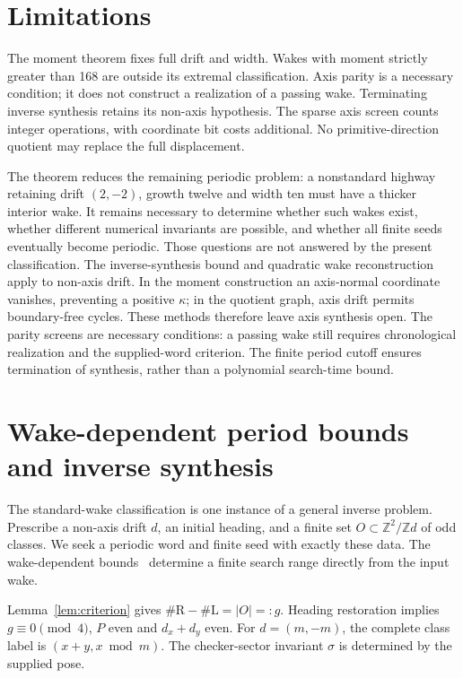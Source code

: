 \documentclass[11pt]{article}
\theoremstyle{definition}\newtheorem{definition}[theorem]{Definition}
\newcommand{\R}{\mathrm R}
\newcommand{\Lturn}{\mathrm L}
\newcommand{\Z}{\mathbb Z}
\begin{document}
\section{Limitations}\label{sec:limitations}
The moment theorem fixes full drift and width. Wakes with moment strictly
greater than 168 are outside its extremal classification.
Axis parity is a necessary condition; it does not construct a realization of a
passing wake. Terminating inverse synthesis retains its non-axis hypothesis.
The sparse axis screen counts integer operations, with coordinate bit costs
additional. No primitive-direction quotient may replace the full displacement.

The theorem reduces the remaining periodic problem: a
nonstandard highway retaining drift $(2,-2)$, growth twelve and width ten must
have a thicker interior wake. It remains necessary to determine whether such
wakes exist, whether different numerical invariants are possible, and whether
all finite seeds eventually become periodic. Those questions are not answered
by the present classification.
The inverse-synthesis bound and quadratic wake reconstruction apply to non-axis
drift. In the moment construction an axis-normal coordinate vanishes, preventing
a positive $\kappa$; in the quotient graph, axis drift permits boundary-free
cycles. These methods therefore leave axis synthesis open. The parity screens
are necessary conditions: a passing wake still requires chronological
realization and the supplied-word criterion. The finite period cutoff ensures
termination of synthesis, rather than a polynomial search-time bound.

\appendix
\section{Wake-dependent period bounds and inverse synthesis}\label{app:general}
The standard-wake classification is one instance of a general inverse
problem. Prescribe a non-axis drift $d$, an initial heading, and a finite
set $O\subset\Z^2/\Z d$ of odd classes. We seek a periodic word and finite
seed with exactly these data. The wake-dependent bounds~\cite{previous}
determine a finite search range directly from the input wake.

Lemma~\ref{lem:criterion} gives $\#\R-\#\Lturn=|O|=:g$.
Heading restoration implies $g\equiv0\pmod4$, $P$ even and $d_x+d_y$ even.
For $d=(m,-m)$, the complete class label is $(x+y,x\bmod m)$.
The checker-sector invariant $\sigma$ is determined by the supplied pose.
\end{document}
